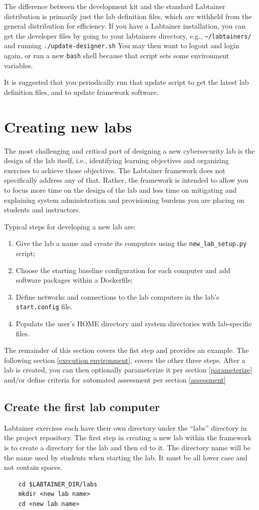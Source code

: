 \documentclass[12pt]{article}
\begin{document}
The difference between the development kit and the standard Labtainer distribution is primarily
just the lab definition files, which are withheld from the general distribution for efficiency.
If you have a Labtainer installation, you can get the developer files by going to your
labtainers directory, e.g., {\tt \~{}/labtainers/} and running {\tt ./update-designer.sh}
You may then want to logout and login again, or run a new {\tt bash} shell because that script
sets some environment variables.

It is suggested that you periodically run that update script to get the latest lab definition files,
and to update framework software.   

\section {Creating new labs}
\label{sec:new_labs}
The most challenging and critical part of designing a new cybersecurity lab
is the design of the lab itself, i.e., identifying learning objectives and
organizing exercises to achieve those objectives.  The Labtainer framework
does not specifically address any of that.  Rather, the framework is intended
to allow you to focus more time on the design of the lab and less time on mitigating and
explaining system administration and provisioning burdens you are placing on 
students and instructors.

Typical steps for developing a new lab are:
\begin{enumerate}
\item Give the lab a name and create its computers using the {\tt new\_lab\_setup.py} script;
\item Choose the starting baseline configuration for each computer and add software packages
within a Dockerfile;
\item Define networks and connections to the lab computers in the lab's {\tt start.config} file.
\item Populate the user's HOME directory and system directories with lab-specific files.
\end{enumerate}
The remainder of this section covers the fist step and provides an example.  The 
following section \ref{execution environment}, covers the other three
steps.  After a lab is created, you can then optionally parameterize it per section \ref{parameterize} and/or
define criteria for automated assessment per section \ref{assessment}

\subsection{Create the first lab computer}
Labtainer exercises each have their own
directory under the ``labs'' directory in the project repository.
The first step in creating a new lab within the framework is to create
a directory for the lab and then cd to it.  The directory name will be the name
used by students when starting the lab.  It must be all lower case and not contain spaces.
\begin{verbatim}
    cd $LABTAINER_DIR/labs
    mkdir <new lab name>
    cd <new lab name>
\end{verbatim}
\end{document}
